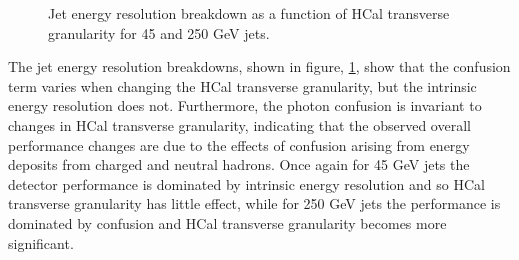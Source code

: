 \begin{figure}
\centering
{}
\caption[Jet energy resolution breakdown as a function of HCal transverse granularity for 45 and 250 GeV jets.]{Jet energy resolution breakdown as a function of HCal transverse granularity for 45 and 250 GeV jets.}
\label{fig:hcalcellsizebreak}
\end{figure}

The jet energy resolution breakdowns, shown in figure, \ref{fig:hcalcellsizebreak}, show that the confusion term varies when changing the HCal transverse granularity, but the intrinsic energy resolution does not.  Furthermore, the photon confusion is invariant to changes in HCal transverse granularity, indicating that the observed overall performance changes are due to the effects of confusion arising from energy deposits from charged and neutral hadrons.  Once again for 45 GeV jets the detector performance is dominated by intrinsic energy resolution and so HCal transverse granularity has little effect, while for 250 GeV jets the performance is dominated by confusion and HCal transverse granularity becomes more significant.  

